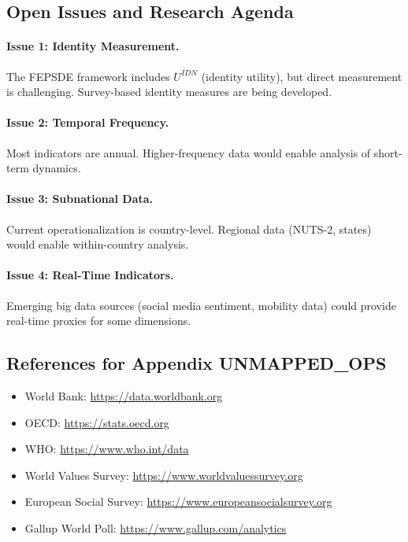 \subsection{Open Issues and Research Agenda}
\label{sec:E-openissues}

\paragraph{Issue 1: Identity Measurement.}
The FEPSDE framework includes $U^{IDN}$ (identity utility), but direct
measurement is challenging. Survey-based identity measures are being developed.

\paragraph{Issue 2: Temporal Frequency.}
Most indicators are annual. Higher-frequency data would enable
analysis of short-term dynamics.

\paragraph{Issue 3: Subnational Data.}
Current operationalization is country-level. Regional data (NUTS-2, states)
would enable within-country analysis.

\paragraph{Issue 4: Real-Time Indicators.}
Emerging big data sources (social media sentiment, mobility data) could
provide real-time proxies for some dimensions.


\subsection{References for Appendix UNMAPPED_OPS}
\label{sec:E-references}

\begin{itemize}[nosep]
    \item World Bank: \url{https://data.worldbank.org}
    \item OECD: \url{https://stats.oecd.org}
    \item WHO: \url{https://www.who.int/data}
    \item World Values Survey: \url{https://www.worldvaluessurvey.org}
    \item European Social Survey: \url{https://www.europeansocialsurvey.org}
    \item Gallup World Poll: \url{https://www.gallup.com/analytics}
\end{itemize}

